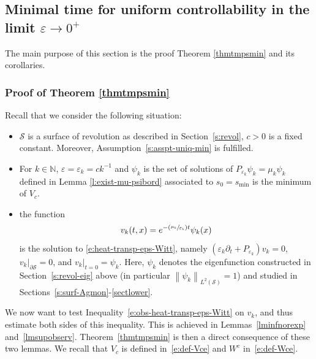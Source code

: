 \documentclass[10pt]{amsart}
\newcommand{\Psfrac}[2]{(\sfrac{#1}{#2})}
\theoremstyle{definition}
\newcommand{\calS}{\ensuremath{\mathcal S}}
\newcommand{\mb}[1]{\ensuremath{\mathbb{#1}}}
\newcommand{\N}{{\mb{N}}}
\newcommand\nor[2]{\left\|#1\right\|_{#2}}
\newcommand{\ce}{c}
\let\d\partial
\let\e\varepsilon
\let\eps\varepsilon
\let\Subsection\subsection\let\Subsubsection\subsubsection
\begin{document}
\Subsection{Minimal time for uniform controllability in the limit $\eps \to 0^+$}
The main purpose of this section is the proof Theorem \ref{thmtmpsmin} and its corollaries.
\subsubsection{Proof of Theorem \ref{thmtmpsmin}}

Recall that we consider the following situation:
\begin{itemize}
\item $\mathcal{S}$ is a surface of revolution as described in Section~\ref{s:revol}, $\ce>0$ is a fixed constant. Moreover, Assumption~\eqref{s:asspt-uniq-min} is fulfilled.
\item For $k\in \N$, $\e=\e_k=\ce k^{-1}$ and $\psi_k$ is the set of solutions of $P_{\e_k} \psi_k = \mu_k \psi_k$ defined in Lemma \ref{l:exist-mu-psibord} associated to $s_{0}=s_{\min}$ is the minimum of $V_{\ce}$.
\item the function
\begin{equation}
\label{e:def-vk}
v_k(t,x)=e^{-\Psfrac{\mu_k}{\e_{k}} t}\psi_k(x)
\end{equation}
is the solution to \eqref{e:heat-transp-eps-Witt}, namely $(\e_k \d_t + P_{\eps_k})v_k = 0$, $v_k|_{\d\calS}=0$, and $v_k|_{t=0} = \psi_k$. Here, $\psi_k$ denotes the eigenfunction constructed in Section~\ref{s:revol-eig} above (in particular $\nor{\psi_k}{L^2(\calS)}=1$) and studied in Sections~\ref{s:surf-Agmon}-\ref{sectlower}.
\end{itemize}
We now want to test Inequality~\eqref{e:obs-heat-transp-eps-Witt} on $v_k$, and thus estimate both sides of this inequality. This is achieved in Lemmas~\ref{lminfnorexp} and~\ref{lmsupobserv}.
Theorem~\ref{thmtmpsmin} is then a direct consequence of these two lemmas.
We recall that $V_\ce$ is defined in~\eqref{e:def-Vce} and $W^{\ce}$ in~\eqref{e:def-Wce}.
\end{document}
